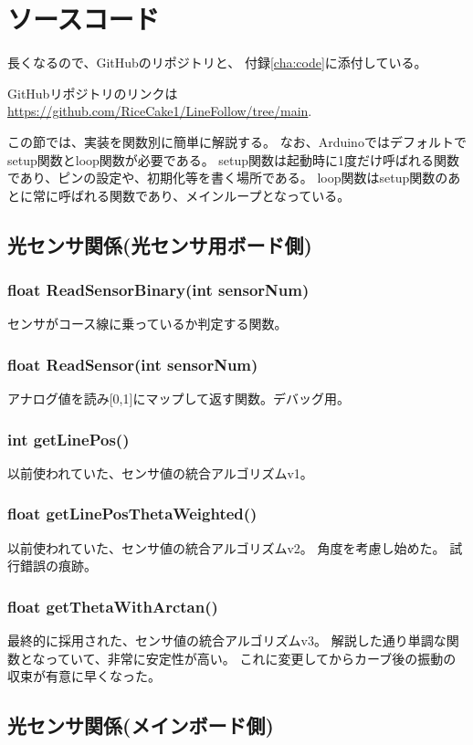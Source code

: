 \documentclass{ltjsreport}
\begin{document}
\section{ソースコード}
長くなるので、GitHubのリポジトリと、
付録\ref{cha:code}に添付している。

GitHubリポジトリのリンクは\url{https://github.com/RiceCake1/LineFollow/tree/main}.

この節では、実装を関数別に簡単に解説する。
なお、Arduinoではデフォルトでsetup関数とloop関数が必要である。
setup関数は起動時に1度だけ呼ばれる関数であり、ピンの設定や、初期化等を書く場所である。
loop関数はsetup関数のあとに常に呼ばれる関数であり、メインループとなっている。

\subsection{光センサ関係(光センサ用ボード側)}
\subsubsection{float ReadSensorBinary(int sensorNum)}
センサがコース線に乗っているか判定する関数。

\subsubsection{float ReadSensor(int sensorNum)}
アナログ値を読み[0,1]にマップして返す関数。デバッグ用。

\subsubsection{int getLinePos()}
以前使われていた、センサ値の統合アルゴリズムv1。

\subsubsection{float getLinePosThetaWeighted()}
以前使われていた、センサ値の統合アルゴリズムv2。
角度を考慮し始めた。
試行錯誤の痕跡。

\subsubsection{float getThetaWithArctan()}
最終的に採用された、センサ値の統合アルゴリズムv3。
解説した通り単調な関数となっていて、非常に安定性が高い。
これに変更してからカーブ後の振動の収束が有意に早くなった。

\subsection{光センサ関係(メインボード側)}
\end{document}
